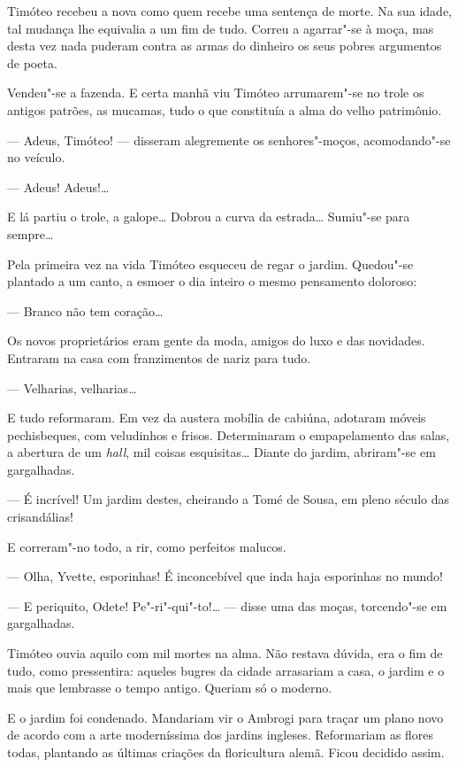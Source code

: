 Timóteo recebeu a nova como quem recebe uma sentença de morte. Na sua
idade, tal mudança lhe equivalia a um fim de tudo. Correu a agarrar"-se à
moça, mas desta vez nada puderam contra as armas do dinheiro os seus
pobres argumentos de poeta.

Vendeu"-se a fazenda. E certa manhã viu Timóteo arrumarem"-se no trole os
antigos patrões, as mucamas, tudo o que constituía a alma do velho
patrimônio.

--- Adeus, Timóteo! --- disseram alegremente os senhores"-moços,
acomodando"-se no veículo.

--- Adeus! Adeus!\ldots{}

E lá partiu o trole, a galope\ldots{} Dobrou a curva da estrada\ldots{} Sumiu"-se
para sempre\ldots{}

Pela primeira vez na vida Timóteo esqueceu de regar o jardim. Quedou"-se
plantado a um canto, a esmoer o dia inteiro o mesmo pensamento doloroso:

--- Branco não tem coração\ldots{}

Os novos proprietários eram gente da moda, amigos do luxo e das
novidades. Entraram na casa com franzimentos de nariz para tudo.

--- Velharias, velharias\ldots{}

E tudo reformaram. Em vez da austera mobília de cabiúna, adotaram móveis
pechisbeques, com veludinhos e frisos. Determinaram o empapelamento das
salas, a abertura de um \emph{hall}, mil coisas esquisitas\ldots{} Diante do
jardim, abriram"-se em gargalhadas.

--- É incrível! Um jardim destes, cheirando a Tomé de Sousa, em pleno
século das crisandálias!

E correram"-no todo, a rir, como perfeitos malucos.

--- Olha, Yvette, esporinhas! É inconcebível que inda haja esporinhas no
mundo!

--- E periquito, Odete! Pe"-ri"-qui"-to!\ldots{} --- disse uma das moças,
torcendo"-se em gargalhadas.

Timóteo ouvia aquilo com mil mortes na alma. Não restava dúvida, era o
fim de tudo, como pressentira: aqueles bugres da cidade arrasariam a
casa, o jardim e o mais que lembrasse o tempo antigo. Queriam só o
moderno.

E o jardim foi condenado. Mandariam vir o Ambrogi para traçar um plano
novo de acordo com a arte moderníssima dos jardins ingleses. Reformariam
as flores todas, plantando as últimas criações da floricultura alemã.
Ficou decidido assim.

